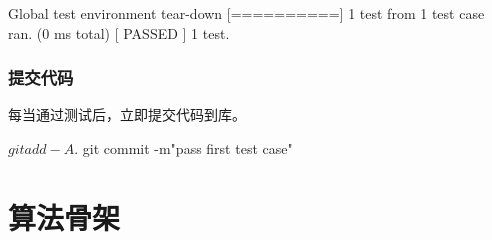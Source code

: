 \begin{content}
\begin{leftbar}
\begin{c++}[caption={\ttfamily{运行测试}}]
[----------] Global test environment tear-down
[==========] 1 test from 1 test case ran. (0 ms total)
[  PASSED  ] 1 test.
 \end{c++}
\end{leftbar}

\subsubsection{提交代码}

每当通过测试后，立即提交代码到库。

\begin{leftbar}
 \begin{c++}[caption={\ttfamily{提交代码}}]
$ git add -A .
$ git commit -m"pass first test case"
 \end{c++}
\end{leftbar}

\end{content}

\section{算法骨架}

